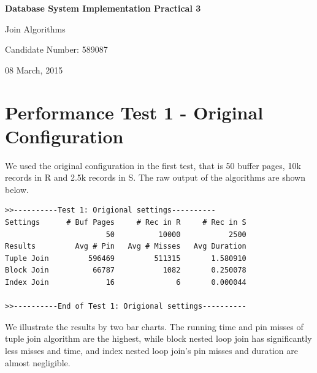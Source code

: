 \documentclass{article}
\begin{document}
\begin{titlepage}
{\centering
{\LARGE\bfseries Database System Implementation Practical 3}

\vspace{0.5cm}

{\Large Join Algorithms}

\vspace{2cm}

{\large Candidate Number: 589087}

\vspace{0.1cm}

{\large 08 March, 2015}

}

\vfill

\end{titlepage}
\newpage
\newpage
\section{Performance Test 1 - Original Configuration}

We used the original configuration in the first test, that is 50 buffer pages, 10k records in R and 2.5k records in S. The raw output of the algorithms are shown below.
\begin{center}
\begin{verbatim}
>>----------Test 1: Origional settings----------
Settings      # Buf Pages     # Rec in R     # Rec in S
                       50          10000           2500
Results         Avg # Pin   Avg # Misses   Avg Duration
Tuple Join         596469         511315       1.580910
Block Join          66787           1082       0.250078
Index Join             16              6       0.000044

>>----------End of Test 1: Origional settings----------
\end{verbatim}
\end{center}
We illustrate the results by two bar charts. The running time and pin misses of tuple join algorithm are the highest, while block nested loop join has significantly less misses and time, and index nested loop join's pin misses and duration are almost negligible.
\end{document}
